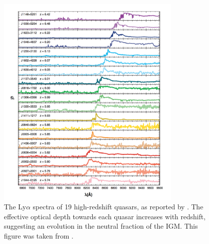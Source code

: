  \begin{figure}
 \centering
 \includegraphics[width=0.8\textwidth]{chapters/eor_intro/figures/FanSpectra.png}
 \caption[The Ly$\alpha$ spectra of 19 high-redshift quasars.]{The Ly$\alpha$ spectra of 19 high-redshift quasars, as reported by \cite{Fan.06.2}. The effective optical depth towards each quasar increases with redshift, suggesting an evolution in the neutral fraction of the IGM. This figure was taken from \cite{Fan.06.review}.}
 \label{fig:eor_intro_qso}
 \end{figure}

